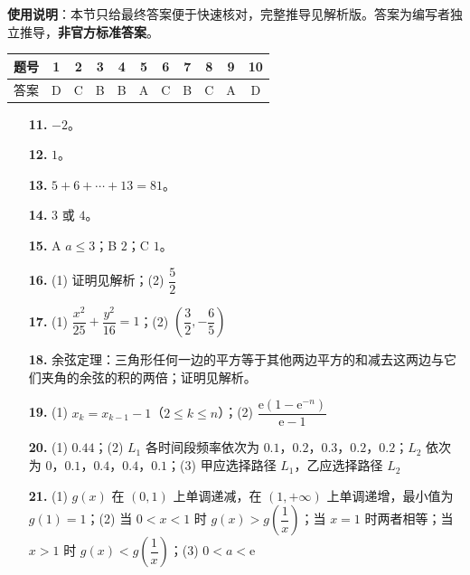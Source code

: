 
\begin{gknotice}
\textbf{使用说明}：本节只给最终答案便于快速核对，完整推导见解析版。答案为编写者独立推导，\textbf{非官方标准答案}。
\end{gknotice}

\begin{center}\begin{tabular}{ccccccccccc}
\toprule
题号 & 1 & 2 & 3 & 4 & 5 & 6 & 7 & 8 & 9 & 10 \\
\midrule
答案 & D & C & B & B & A & C & B & C & A & D \\
\bottomrule
\end{tabular}\end{center}

\begin{itemize}[leftmargin=2.6em]
  \item[\textbf{11.}] $-2$。
  \item[\textbf{12.}] $1$。
  \item[\textbf{13.}] $5+6+\cdots+13=81$。
  \item[\textbf{14.}] $3$ 或 $4$。
  \item[\textbf{15.}] A $a\leqslant3$；B $2$；C $1$。
\end{itemize}

\begin{itemize}[leftmargin=2.6em]
  \item[\textbf{16.}] (1) 证明见解析；(2) $\dfrac52$
  \item[\textbf{17.}] (1) $\dfrac{x^2}{25}+\dfrac{y^2}{16}=1$；(2) $\left(\dfrac32,-\dfrac65\right)$
  \item[\textbf{18.}] 余弦定理：三角形任何一边的平方等于其他两边平方的和减去这两边与它们夹角的余弦的积的两倍；证明见解析。
  \item[\textbf{19.}] (1) $x_k=x_{k-1}-1$（$2\leqslant k\leqslant n$）；(2) $\dfrac{\mathrm e\left(1-\mathrm e^{-n}\right)}{\mathrm e-1}$
  \item[\textbf{20.}] (1) $0.44$；(2) $L_1$ 各时间段频率依次为 $0.1$，$0.2$，$0.3$，$0.2$，$0.2$；$L_2$ 依次为 $0$，$0.1$，$0.4$，$0.4$，$0.1$；(3) 甲应选择路径 $L_1$，乙应选择路径 $L_2$
  \item[\textbf{21.}] (1) $g(x)$ 在 $(0,1)$ 上单调递减，在 $(1,+\infty)$ 上单调递增，最小值为 $g(1)=1$；(2) 当 $0<x<1$ 时 $g(x)>g\left(\dfrac1x\right)$；当 $x=1$ 时两者相等；当 $x>1$ 时 $g(x)<g\left(\dfrac1x\right)$；(3) $0<a<\mathrm e$
\end{itemize}
